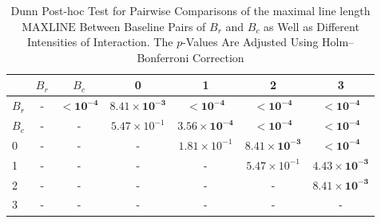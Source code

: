 \begin{table*}[!t]
\caption{Dunn Post-hoc Test for Pairwise Comparisons of the maximal line length $\text{MAXLINE}$  Between Baseline Pairs of $B_r$ and $B_c$ as Well as Different Intensities of Interaction. The $p$-Values Are Adjusted Using Holm--Bonferroni Correction\label{tab:dunn_maxline}}
\centering
\begin{tabular}{lcccccc}
\toprule
 & $B_r$ & $B_c$ & 0 & 1 & 2 & 3 \\
\midrule
$B_r$ & - & $\mathbf{< 10^{-4}}$ & $\mathbf{8.41 \times 10^{-3}}$ & $\mathbf{< 10^{-4}}$ & $\mathbf{< 10^{-4}}$ & $\mathbf{< 10^{-4}}$ \\
$B_c$ & - & - & $5.47 \times 10^{-1}$ & $\mathbf{3.56 \times 10^{-4}}$ & $\mathbf{< 10^{-4}}$ & $\mathbf{< 10^{-4}}$ \\
0 & - & - & - & $1.81 \times 10^{-1}$ & $\mathbf{8.41 \times 10^{-3}}$ & $\mathbf{< 10^{-4}}$ \\
1 & - & - & - & - & $5.47 \times 10^{-1}$ & $\mathbf{4.43 \times 10^{-3}}$ \\
2 & - & - & - & - & - & $\mathbf{8.41 \times 10^{-3}}$ \\
3 & - & - & - & - & - & - \\
\bottomrule
\end{tabular}
\end{table*}
